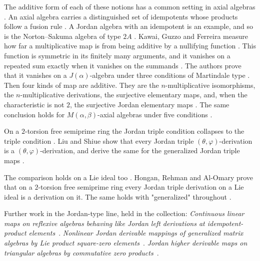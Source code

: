 The additive form of each of these notions has a common setting in axial
algebras \cite[p.~1]{KawaiGuzzoFerreira2025}. An axial algebra carries a
distinguished set of idempotents whose products follow a fusion rule
\cite[Definition~2.3, p.~5]{KawaiGuzzoFerreira2025}. A Jordan algebra with an
idempotent is an example, and so is the Norton--Sakuma algebra of type $2A$
\cite[Example~4.2, p.~8]{KawaiGuzzoFerreira2025}. Kawai, Guzzo and Ferreira
measure how far a multiplicative map is from being additive by a nullifying
function \cite[Definition~3.5, p.~6]{KawaiGuzzoFerreira2025}. This function is
symmetric in its finitely many arguments, and it vanishes on a repeated sum
exactly when it vanishes on the summands \cite[Definition~3.5,
p.~6]{KawaiGuzzoFerreira2025}. The authors prove that it vanishes on a
$J(\alpha)$-algebra under three conditions of Martindale type
\cite[Theorem~4.1, p.~8]{KawaiGuzzoFerreira2025}. Then four kinds of map are
additive. They are the $n$-multiplicative isomorphisms, the $n$-multiplicative
derivations, the surjective elementary maps, and, when the characteristic is
not $2$, the surjective Jordan elementary maps \cite[Corollary~4.1,
p.~10]{KawaiGuzzoFerreira2025}. The same conclusion holds for
$M(\alpha,\beta)$-axial algebras under five conditions \cite[Theorem~5.1,
p.~12]{KawaiGuzzoFerreira2025}.

On a $2$-torsion free semiprime ring the Jordan triple condition collapses to
the triple condition \cite[Abstract]{LiuShiue2007JordanTriple}. Liu and Shiue
show that every Jordan triple $(\theta,\varphi)$-derivation is a
$(\theta,\varphi)$-derivation, and derive the same for the generalized Jordan
triple maps \cite[Abstract]{LiuShiue2007JordanTriple}.

The comparison holds on a Lie ideal too
\cite[Abstract]{HonganRehmanAlOmary2011}. Hongan, Rehman and Al-Omary prove
that on a $2$-torsion free semiprime ring every Jordan triple derivation on a
Lie ideal is a derivation on it. The same holds with "generalized" throughout %
\cite[Abstract]{HonganRehmanAlOmary2011}.

Further work in the Jordan-type line, held in the collection:
\noindent\emph{Continuous linear maps on reflexive algebras behaving like
Jordan left derivations at idempotent-product
elements}~\cite{LibContinuousLinearMapsOn2013}. \noindent\emph{Nonlinear
Jordan derivable mappings of generalized matrix algebras by Lie product
square-zero elements}~\cite{LibNonlinearJordanDerivableMappings2021}.
\noindent\emph{Jordan higher derivable maps on triangular algebras by
commutative zero products}~\cite{LibJordanHigherDerivableMaps2016}.


